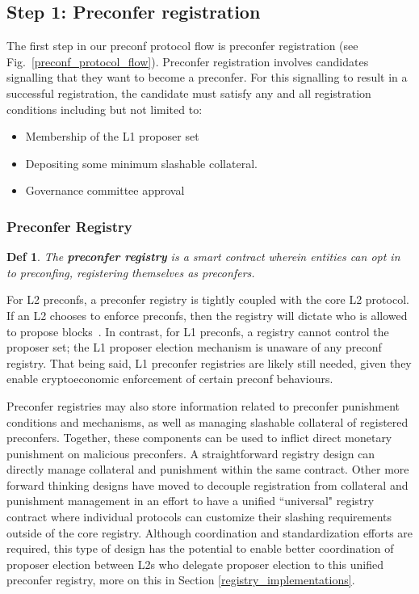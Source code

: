 \documentclass[a4paper]{article}
\theoremstyle{boldstyle}
\newtheorem*{definitionx}{Def}
\newenvironment{definition}
  {\begin{defopenboxq}\begin{definitionx}}
  {\end{definitionx}\end{defopenboxq}}
\begin{document}
\subsection{Step 1: Preconfer registration}
\label{step1:preconfer_registration}
    The first step in our preconf protocol flow is preconfer registration (see Fig.~\ref{preconf_protocol_flow}). Preconfer registration involves candidates signalling that they want to become a preconfer. For this signalling to result in a successful registration, the candidate must satisfy any and all registration conditions including but not limited to:
    \begin{itemize}
        \item Membership of the L1 proposer set
        \item Depositing some minimum slashable collateral.
        \item Governance committee approval
    \end{itemize}

        \subsubsection{Preconfer Registry} \label{preconfer_registry}
        \begin{definition}
        The \textbf{preconfer registry} is a smart contract wherein entities can opt in to preconfing, registering themselves as preconfers. 
        \end{definition}
        For L2 preconfs, a preconfer registry is tightly coupled with the core L2 protocol. If an L2 chooses to enforce preconfs, then the registry will dictate who is allowed to propose blocks~\cite{W:SequencerOpt-InDiscoveryandCommunication}. In contrast, for L1 preconfs, a registry cannot control the proposer set; the L1 proposer election mechanism is unaware of any preconf registry. That being said, L1 preconfer registries are likely still needed, given they enable cryptoeconomic enforcement of certain preconf behaviours. 
 
        Preconfer registries may also store information related to preconfer punishment conditions and mechanisms, as well as managing slashable collateral of registered preconfers. Together, these components can be used to inflict direct monetary punishment on malicious preconfers. A straightforward registry design can directly manage collateral and punishment within the same contract. Other more forward thinking designs have moved to decouple registration from collateral and punishment management in an effort to have a unified ``universal" registry contract \cite{W:UniversalRegistryContract} where individual protocols can customize their slashing requirements outside of the core registry. Although coordination and standardization efforts are required, this type of design has the potential to enable better coordination of proposer election between L2s who delegate proposer election to this unified preconfer registry, more on this in Section \ref{registry_implementations}.
         
\end{document}
